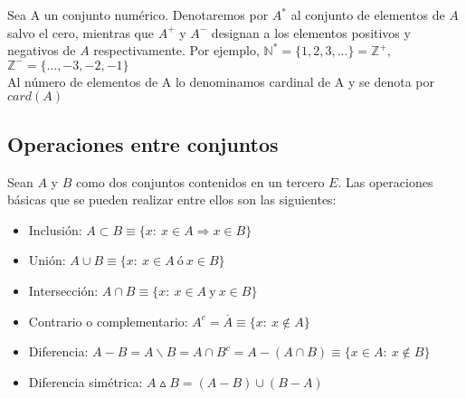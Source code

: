 \documentclass[0_algebra.tex]{subfiles}
\begin{document}
Sea A un conjunto numérico. Denotaremos por $A^*$ al conjunto de elementos de $A$ salvo el cero, mientras que $A^+$ y $A^-$ designan a los elementos positivos y negativos de $A$ respectivamente. Por ejemplo, $\mathbb{N}^*=\lbrace 1,2,3,... \rbrace = \mathbb{Z}^+$, $\mathbb{Z}^-=\lbrace ...,-3,-2,-1\rbrace$\\

Al número de elementos de A lo denominamos cardinal de A y se denota por $card(A)$


\subsection*{Operaciones entre conjuntos}
Sean $A$ y $B$ como dos conjuntos contenidos en un tercero $E$. Las operaciones básicas que se pueden realizar entre ellos son las siguientes:

\begin{itemize}
    \item Inclusión: $A\subset B \equiv \lbrace x: \ x \in A \Rightarrow x \in B \rbrace$
\begin{figure}[h]
\centering

\end{figure}

\item Unión: $A \cup B \equiv \lbrace x: \ x \in A\ \text{ó} \ x \in B\rbrace$

\begin{figure}[h]
\centering

\end{figure}

\item Intersección: $A \cap B \equiv \lbrace x: \ x \in A\ \text{y} \ x \in B\rbrace$

\begin{figure}[h]
\centering

\end{figure}
\newpage

\item Contrario o complementario: $A^c = \overline{A} \equiv \lbrace x:\ x \not \in A \rbrace$

\begin{figure}[h]
\centering

\end{figure}


\item Diferencia: $A-B= A\backslash B=A\cap B^c=A-(A\cap B)\equiv \lbrace x \in A:\ x \not \in B \rbrace$

\begin{figure}[h]
\centering

\end{figure}

\item Diferencia simétrica: $A\vartriangle B=(A-B)\cup (B-A)$

\begin{figure}[h]
\centering

\end{figure}

\end{itemize}
\end{document}
